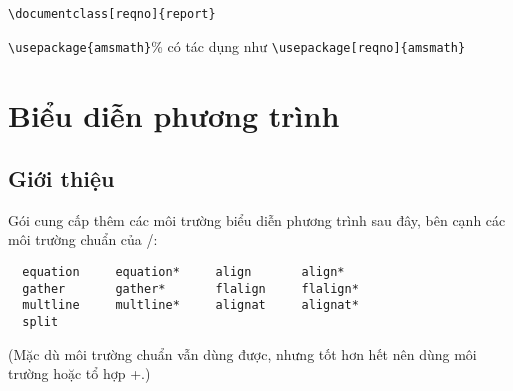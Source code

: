 \documentclass[11pt,leqno,titlepage,openany,oneside]{amsldoc}[1999/12/13]
\begin{document}
\medskip
\verb"\documentclass[reqno]{report}"\par
\indent\verb"\usepackage{amsmath}"\% có tác dụng như \verb"\usepackage[reqno]{amsmath}"


\chapter{Biểu diễn phương trình}

\section{Giới thiệu}
Gói  cung cấp thêm các môi trường biểu diễn phương trình sau
đây, bên cạnh các môi trường chuẩn của \latex/:
\begin{verbatim}
  equation     equation*     align       align*
  gather       gather*       flalign     flalign*
  multline     multline*     alignat     alignat*
  split
\end{verbatim}
(Mặc dù môi trường chuẩn  vẫn dùng được, nhưng tốt hơn hết
nên dùng môi trường  hoặc tổ hợp +.)

\medskip
\end{document}
